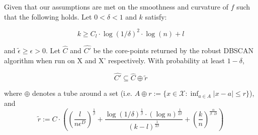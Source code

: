 \begin{theorem}
Given that our assumptions are met on the smoothness and curvature of $f$ such that the following holds. Let $0<\delta<1$ and $k$ satisfy:

\begin{equation*}
    k\geq C_l\cdot\log(1/\delta)^2\cdot\log(n) + l
\end{equation*}

and $\tilde{\epsilon}\geq\epsilon>0$. Let $\hat{C}$ and $\hat{C'}$ be the core-points returned by the robust DBSCAN algorithm when run on X and X' respectively. With probability at least $1-\delta$,

\begin{equation*}
    \hat{C'}\subseteq \hat{C}\oplus\tilde{r}
\end{equation*}

where $\oplus$ denotes a tube around a set (i.e. $A \oplus r := \{x\in\mathcal{X}: \inf_{a\in A}|x-a|\leq r\}$), and
\begin{equation*}
    \tilde{r}:=C\cdot\left(\left(\frac{l}{n\epsilon^D}\right)^{\frac{1}{\beta}} + \frac{\log(1/\delta)^{\frac{1}{\beta}}\cdot(\log n)^\frac{1}{2\beta}}{(k-l)^{\frac{1}{2\beta}}} + \left(\frac{k}{n}\right)^{\frac{\alpha}{\beta\cdot D}}\right)
\end{equation*}
\end{theorem}

